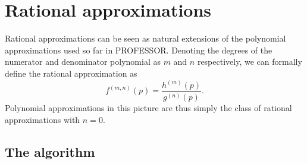
\section{Rational approximations}
\label{sec-rapp}

Rational approximations can be seen as natural extensions of the polynomial
approximations used so far in PROFESSOR. Denoting the degrees of the numerator 
and denominator polynomial as $m$ and $n$ respectively, we can formally define
the rational approximation as
\begin{equation}\label{eq:rappdef}
    f^{(m,n)}(p) = \frac{h^{(m)}(p)}{g^{(n)}(p)}.
\end{equation}
Polynomial approximations in this picture are thus simply the class of rational approximations with $n=0$.

\subsection{The algorithm}

